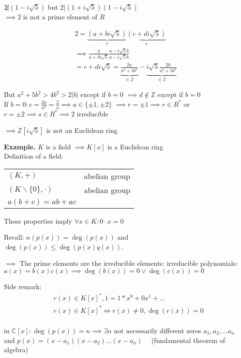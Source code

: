 $2 \not| (1 - i\sqrt{5})$ but $2 | (1+i\sqrt{5})(1-i\sqrt{5})$ \\
$\implies 2$ is not a prime element of $R$

\begin{align*}
  2 = \underbrace{(a+bi \sqrt{5})}_{r} \underbrace{(c+di\sqrt{5})}_{s}\\
  \implies \frac{2}{a+ib\sqrt{5}} \frac{a-i\sqrt{5}b}{a-i\sqrt{5}b} \\
  = c+di\sqrt{5}
= \underbrace{\frac{2a}{a^2 + 5b^2}}_{\in \mathbb{Z}} - \underbrace{i\sqrt{5} \frac{2b}{a^2 + 5b^2}}_{\in \mathbb{Z}}
\end{align*}

But $a^2 + 5b^2 > 4b^2 > 2|b|$ except if $ b=0$ $\implies d \not\in \mathbb{Z}$ except if $b=0$ \\
If $b=0: c = \frac{2a}{a^2} = \frac{2}{a} \implies a \in \{\pm 1, \pm 2\}$
$\implies r = \pm 1 \implies r \in R^{*}$ or $ r = \pm 2 \implies s \in R^{*} \implies 2 $ irreducible

$\implies \mathbb{Z}[i\sqrt{5}]$ is not an Euclidean ring

\textbf{Example.}
$K$ is a field $\implies K[x]$ is a Euclidean ring\\

Definition of a field:
\begin{tabular}{ll}
  $(K,+)$ &abelian group \\
  $(K\backslash \{0\}, \cdot)$ & abelian group \\
  $a(b+c) = ab + ac$
\end{tabular}

These properties imply $\forall x \in K: 0\cdot x = 0$

Recall:
$n(p(x)) = \deg(p(x))$ and
$\deg(p(x)) \leq \deg(p(x) q(x))$.

$\implies$ The prime elements are the irreducible elements: irreducible polynomials: $a(x) = b(x)c(x) \implies \deg(b(x))=0 \lor \deg(c(x))=0$

Side remark:
\begin{align*}
  &r(x) \in K[x]^{*}, 1 = 1*x^0 + 0 x^1 + \ldots \\
  &r(x) \in K[x]^{*} \Leftrightarrow r(x) \neq 0, \deg(r(x)) = 0\\
\end{align*}

in $\mathbb{C}[x]:
\deg(p(x)) = n \implies \exists n$ not necessarily different zeros $a_1, a_2, \ldots a_n$ and $p(x) = (x-a_1)(x-a_2) \ldots (x-a_n) \quad$ (fundamental theorem of algebra)

